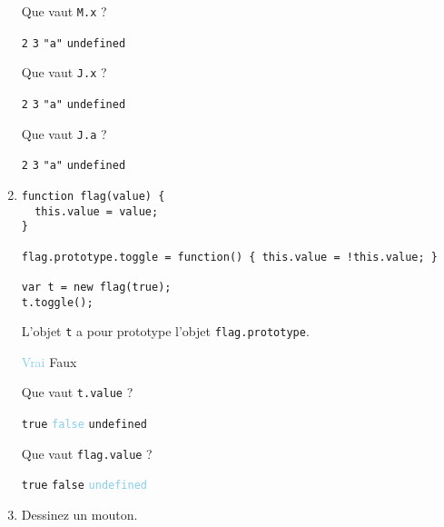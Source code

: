 \documentclass[a4paper, 12pt]{article}
\newcommand{\fullpoint}[1]{\textcolor{RubineRed}{#1}}
\newcommand{\halfpoint}[1]{\textcolor{SkyBlue}{#1}}
\newcommand{\choice}[1]{\Square\hspace{2pt} #1\hspace{5pt}}
\newcommand{\choicec}[1]{\Square\hspace{2pt} \lstinline{#1}\hspace{5pt}}
\newcommand{\choicecg}[1]{\fullpoint{\XBox\hspace{2pt} \lstinline{#1}\hspace{5pt}}}
\newcommand{\choicegh}[1]{\halfpoint{\XBox\hspace{2pt} #1\hspace{5pt}}}
\newcommand{\choicecgh}[1]{\halfpoint{\XBox\hspace{2pt} \lstinline{#1}\hspace{5pt}}}
\begin{document}
\begin{enumerate}
  Que vaut \lstinline{M.x} ?

  \choicec{2} \choicecg{3} \choicec{"a"} \choicec{undefined}

  Que vaut \lstinline{J.x} ?

  \choicec{2} \choicecg{3} \choicec{"a"} \choicec{undefined}

  Que vaut \lstinline{J.a} ?

  \choicec{2} \choicec{3} \choicecg{"a"} \choicec{undefined}
\item \lstset{language=javascript}
\begin{lstlisting}
function flag(value) {
  this.value = value;
}

flag.prototype.toggle = function() { this.value = !this.value; }

var t = new flag(true);
t.toggle();
\end{lstlisting}

  L'objet \lstinline{t} a pour prototype l'objet
  \lstinline{flag.prototype}.

  \choicegh{Vrai} \choice{Faux}

  Que vaut \lstinline{t.value} ?

  \choicec{true} \choicecgh{false} \choicec{undefined}

  Que vaut \lstinline{flag.value} ?

  \choicec{true} \choicec{false} \choicecgh{undefined}
\item Dessinez un mouton.
\end{enumerate}
\end{document}
